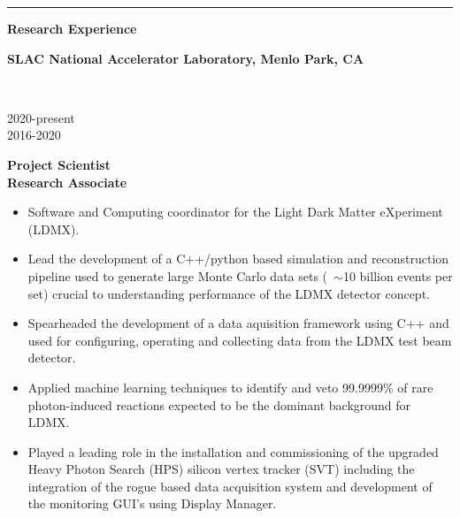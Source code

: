 \documentclass[11pt]{article}
\newcommand{\cvsection}[1] {
    \noindent
    \textcolor{indigodye}{\rule{.15\textwidth}{.1in} \hspace{0.01 \textwidth} \textbf{\Large{#1}}} \newline 
}
\newcommand{\experienceentry}[5] { 
    \noindent
    \begin{minipage}[t]{0.84\textwidth} 
      \textbf{#1, #2}
    \end{minipage} \\[0.01pt]
    \begin{minipage}[t]{0.15\textwidth} \begin{flushright} #3 \end{flushright} \end{minipage} \hspace{0.01\textwidth}
    \begin{minipage}[t]{0.84\textwidth} 
      \textbf{\textcolor{indigodye}{#4}} \vspace{5pt} %
    \end{minipage} 
    #5 \vspace{11pt}
}
\begin{document}
    \cvsection{Research Experience}
        \experienceentry{SLAC National Accelerator Laboratory}{Menlo Park, CA}
                        {2020-present \\ 2016-2020}
                        {Project Scientist \\ Research Associate}
                        {                   
            \begin{itemize}[label=\textcolor{indigodye}{$\circ$}, noitemsep, nolistsep, leftmargin=0.19\textwidth]
                \item Software and Computing coordinator for the Light Dark Matter eXperiment (LDMX).
                \item Lead the development of a C++/python based simulation and reconstruction 
                  pipeline used to generate large Monte Carlo data sets (~$\sim$10 billion events per set) crucial
                  to understanding performance of the LDMX detector concept.
                \item Spearheaded the development of a data aquisition framework using C++ and used for 
                      configuring, operating and collecting data from the LDMX test beam detector.
                \item Applied machine learning techniques to identify and veto 99.9999\% of rare 
                      photon-induced reactions expected to be the dominant background for LDMX.     
                \item Played a leading role in the installation and commissioning of the upgraded Heavy Photon Search 
                      (HPS) silicon vertex tracker (SVT) including the integration of the rogue based data 
                      acquisition system and 
                      development of the monitoring GUI's using Display Manager.

\end{itemize}}
\end{document}
